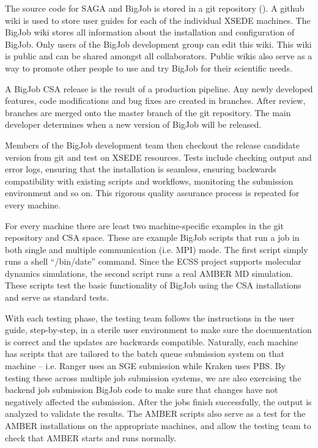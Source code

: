\documentclass{sig-alternate}
\begin{document}
The source code for SAGA and BigJob is stored in a
git repository (\cite{bigjob_web}). A github wiki is used to store user guides
for each of the individual XSEDE machines. The BigJob wiki stores all
information about the installation and configuration of BigJob. Only users of
the BigJob development group can edit this wiki. This wiki is public and can be
shared amongst all collaborators. Public wikis also serve as a way to promote
other people to use and try BigJob for their scientific needs.

A BigJob CSA release is the result of a production pipeline. Any newly developed
features, code modifications and bug fixes are created in branches. After
review, branches are merged onto the master branch of the git repository. The
main developer determines when a new version of BigJob will be released. 

Members of the BigJob development team then checkout the release candidate
version from git and test on XSEDE resources. Tests include checking output and error logs, 
ensuring that the installation is seamless, ensuring backwards compatibility with existing 
scripts and workflows, monitoring the submission environment and so on. This rigorous quality 
assurance process is repeated for every machine.

For every machine there are least two machine-specific examples in the git
repository and CSA space. These are example BigJob scripts that run a job in
both single and multiple communication (i.e. MPI) mode. The first script simply
runs a shell ``/bin/date'' command. Since the ECSS project supports molecular
dynamics simulations, the second script runs a real AMBER MD simulation. These
scripts test the basic functionality of BigJob using the CSA installations and
serve as standard tests.

With each testing phase, the testing team follows the instructions in the user
guide, step-by-step, in a sterile user environment to make sure the
documentation is correct and the updates are backwards compatible.
Naturally, each machine has scripts that are tailored to the batch queue submission
system on that machine -- i.e. Ranger uses an SGE submission while Kraken uses
PBS. By testing these across multiple job submission systems, we are also
exercising the backend job submission BigJob code to make sure that changes have
not negatively affected the submission. After the jobs finish successfully, the
output is analyzed to validate the results. The AMBER scripts also serve as a
test for the AMBER installations on the appropriate machines, and allow the
testing team to check that AMBER starts and runs normally.
\end{document}
